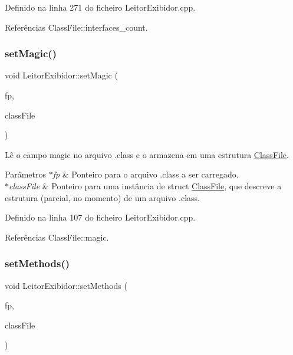 Definido na linha 271 do ficheiro Leitor\+Exibidor.\+cpp.



Referências Class\+File\+::interfaces\+\_\+count.

\mbox{\label{classLeitorExibidor_a08d4a6ea1c0f054f6f2969afe96a1d99}} 
\subsubsection{\texorpdfstring{set\+Magic()}{setMagic()}}
{\footnotesize\ttfamily void Leitor\+Exibidor\+::set\+Magic (\begin{DoxyParamCaption}\item[{F\+I\+LE $\ast$}]{fp,  }\item[{\hyperlink{classClassFile}{Class\+File} $\ast$}]{class\+File }\end{DoxyParamCaption})\hspace{0.3cm}{\ttfamily [private]}}

Lê o campo magic no arquivo .class e o armazena em uma estrutura \hyperlink{classClassFile}{Class\+File}. 
\begin{DoxyParams}{Parâmetros}
{\em $\ast$fp} & Ponteiro para o arquivo .class a ser carregado. \\
\hline
{\em $\ast$class\+File} & Ponteiro para uma instância de struct \hyperlink{classClassFile}{Class\+File}, que descreve a estrutura (parcial, no momento) de um arquivo .class. \\
\hline
\end{DoxyParams}


Definido na linha 107 do ficheiro Leitor\+Exibidor.\+cpp.



Referências Class\+File\+::magic.

\mbox{\label{classLeitorExibidor_aa7ce00ed1b02c20c2eb7ff1b503563d5}} 
\subsubsection{\texorpdfstring{set\+Methods()}{setMethods()}}
{\footnotesize\ttfamily void Leitor\+Exibidor\+::set\+Methods (\begin{DoxyParamCaption}\item[{F\+I\+LE $\ast$}]{fp,  }\item[{\hyperlink{classClassFile}{Class\+File} $\ast$}]{class\+File }\end{DoxyParamCaption})\hspace{0.3cm}{\ttfamily [private]}}


